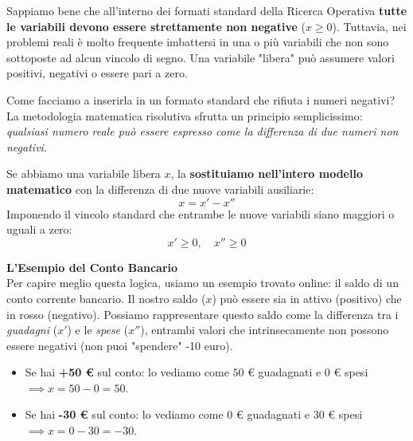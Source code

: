 \documentclass[12pt, a4paper]{article}
\begin{document}
	\vspace{0.2cm}
	Sappiamo bene che all'interno dei formati standard della Ricerca Operativa \textbf{tutte le variabili devono essere strettamente non negative} ($x \geq 0$). Tuttavia, nei problemi reali è molto frequente imbattersi in una o più variabili che non sono sottoposte ad alcun vincolo di segno. Una variabile "libera" può assumere valori positivi, negativi o essere pari a zero.
	
	Come facciamo a inserirla in un formato standard che rifiuta i numeri negativi? 
	La metodologia matematica risolutiva sfrutta un principio semplicissimo: \textit{qualsiasi numero reale può essere espresso come la differenza di due numeri non negativi}.
	
	Se abbiamo una variabile libera $x$, la \textbf{sostituiamo nell'intero modello matematico} con la differenza di due nuove variabili ausiliarie:
	\[
	x = x' - x''
	\]
	Imponendo il vincolo standard che entrambe le nuove variabili siano maggiori o uguali a zero:
	\[
	x' \geq 0, \quad x'' \geq 0
	\]
	
	\textbf{L'Esempio del Conto Bancario}\\
	Per capire meglio questa logica, usiamo un esempio trovato online: il saldo di un conto corrente bancario.
	Il nostro saldo ($x$) può essere sia in attivo (positivo) che in rosso (negativo). Possiamo rappresentare questo saldo come la differenza tra i \textit{guadagni} ($x'$) e le \textit{spese} ($x''$), entrambi valori che intrinsecamente non possono essere negativi (non puoi "spendere" -10 euro).
	\begin{itemize}[label=$\circ$, itemsep=2pt, leftmargin=1.5cm]
		\item Se hai \textbf{+50 €} sul conto: lo vediamo come $50$ € guadagnati e $0$ € spesi $\implies x = 50 - 0 = 50$.
		\item Se hai \textbf{-30 €} sul conto: lo vediamo come $0$ € guadagnati e $30$ € spesi $\implies x = 0 - 30 = -30$.
	\end{itemize}
	
\end{document}
